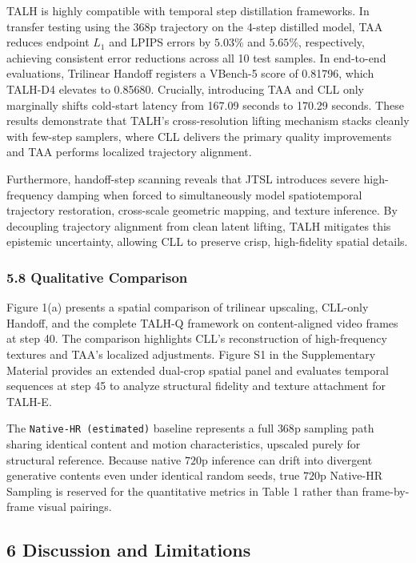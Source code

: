 TALH is highly compatible with temporal step distillation frameworks. In transfer testing using the \(368\text{p}\) trajectory on the 4-step distilled model, TAA reduces endpoint \(L_1\) and LPIPS errors by \(5.03\%\) and \(5.65\%\), respectively, achieving consistent error reductions across all 10 test samples. In end-to-end evaluations, Trilinear Handoff registers a VBench-5 score of 0.81796, which TALH-D4 elevates to 0.85680. Crucially, introducing TAA and CLL only marginally shifts cold-start latency from 167.09 seconds to 170.29 seconds. These results demonstrate that TALH's cross-resolution lifting mechanism stacks cleanly with few-step samplers, where CLL delivers the primary quality improvements and TAA performs localized trajectory alignment.

Furthermore, handoff-step scanning reveals that JTSL introduces severe high-frequency damping when forced to simultaneously model spatiotemporal trajectory restoration, cross-scale geometric mapping, and texture inference. By decoupling trajectory alignment from clean latent lifting, TALH mitigates this epistemic uncertainty, allowing CLL to preserve crisp, high-fidelity spatial details.

\hypertarget{qualitative-comparison}{%
\subsubsection{5.8 Qualitative Comparison}\label{qualitative-comparison}}

Figure 1(a) presents a spatial comparison of trilinear upscaling, CLL-only Handoff, and the complete TALH-Q framework on content-aligned video frames at step 40. The comparison highlights CLL's reconstruction of high-frequency textures and TAA's localized adjustments. Figure S1 in the Supplementary Material provides an extended dual-crop spatial panel and evaluates temporal sequences at step 45 to analyze structural fidelity and texture attachment for TALH-E.

The \texttt{Native-HR\ (estimated)} baseline represents a full \(368\text{p}\) sampling path sharing identical content and motion characteristics, upscaled purely for structural reference. Because native \(720\text{p}\) inference can drift into divergent generative contents even under identical random seeds, true \(720\text{p}\) Native-HR Sampling is reserved for the quantitative metrics in Table 1 rather than frame-by-frame visual pairings.

\hypertarget{discussion-and-limitations}{%
\subsection{6 Discussion and Limitations}\label{discussion-and-limitations}}

